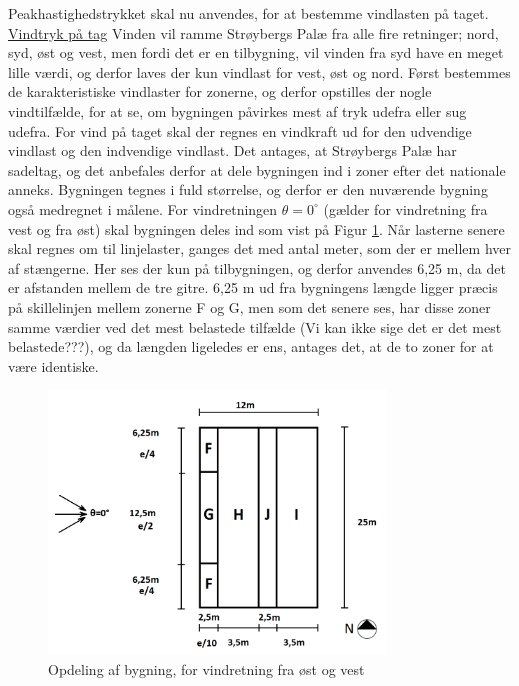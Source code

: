 Peakhastighedstrykket skal nu anvendes, for at bestemme vindlasten på taget. 
\newline
\newline
\underline{Vindtryk på tag}
\newline
Vinden vil ramme Strøybergs Palæ fra alle fire retninger; nord, syd, øst og vest, men fordi det er en tilbygning, vil vinden fra syd have en meget lille værdi, og derfor laves der kun vindlast for vest, øst og nord. 
\newline \indent{     }  Først bestemmes de karakteristiske vindlaster for zonerne, og derfor opstilles der nogle vindtilfælde, for at se, om bygningen påvirkes mest af tryk udefra eller sug udefra. 
\newline
\newline
For vind på taget skal der regnes en vindkraft ud for den udvendige vindlast og den indvendige vindlast. Det antages, at Strøybergs Palæ har sadeltag, og det anbefales derfor at dele bygningen ind i zoner efter det nationale anneks. Bygningen tegnes i fuld størrelse, og derfor er den nuværende bygning også medregnet i målene. For vindretningen $\theta = 0^{\circ}$ (gælder for vindretning fra vest og fra øst) skal bygningen deles ind som vist på Figur \ref{fig:opdeling}. 
\newline \indent{     }  Når lasterne senere skal regnes om til linjelaster, ganges det med antal meter, som der er mellem hver af stængerne. Her ses der kun på tilbygningen, og derfor anvendes 6,25 m, da det er afstanden mellem de tre gitre. 6,25 m ud fra bygningens længde ligger præcis på skillelinjen mellem zonerne F og G, men som det senere ses, har disse zoner samme værdier ved det mest belastede tilfælde (Vi kan ikke sige det er det mest belastede???), og da længden ligeledes er ens, antages det, at de to zoner for at være identiske. 

\begin{figure}[htbp]
	\centering
	\includegraphics[width=0.8\textwidth]{billeder/opdeling.png}
	\caption{Opdeling af bygning, for vindretning fra øst og vest}
	\label{fig:opdeling}
\end{figure}

